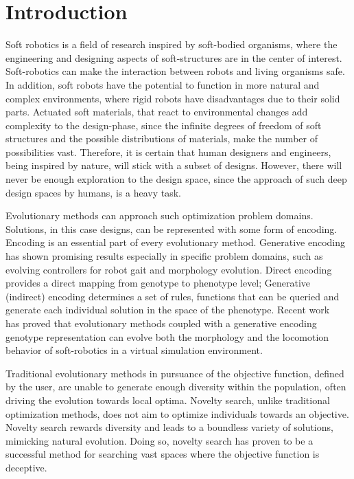 
\chapter{Introduction} %

\label{Chapter1} %


Soft robotics is a field of research inspired by soft-bodied organisms, where the engineering and designing aspects of soft-structures are in the center of interest. Soft-robotics can make the interaction between robots and living organisms safe. In addition, soft robots have the potential to function in more natural and  complex environments, where rigid robots have disadvantages due to their solid parts. Actuated soft materials, that react to environmental changes add complexity to the design-phase, since the infinite degrees of freedom of soft structures and the possible distributions of materials, make the number of possibilities vast. Therefore, it is certain that human designers and engineers, being inspired by nature, will stick with a subset of designs. However, there will never be enough exploration to the design space, since the approach of such deep design spaces by humans, is a heavy task.

Evolutionary methods can approach such optimization problem domains. Solutions, in this case designs, can be represented with some form of encoding. Encoding is an essential part of every evolutionary method. Generative encoding has shown promising results especially in specific problem domains, such as evolving controllers for robot gait and morphology evolution. Direct encoding provides a direct mapping from genotype to phenotype level; Generative (indirect) encoding determines a set of rules, functions that can be queried and generate each individual solution in the space of the phenotype. Recent work~\citep{cheney2013unshackling} has proved that evolutionary methods coupled with a generative encoding genotype representation can evolve both the morphology and the locomotion behavior of soft-robotics in a virtual simulation environment.

Traditional evolutionary methods in pursuance of the objective function, defined by the user, are unable to generate enough diversity within the population, often driving the evolution towards local optima. Novelty search, unlike traditional optimization methods, does not aim to optimize individuals towards an objective. Novelty search rewards diversity and leads to a boundless variety of solutions, mimicking natural evolution. Doing so, novelty search has proven to be a successful method for searching vast spaces where the objective function is deceptive.

